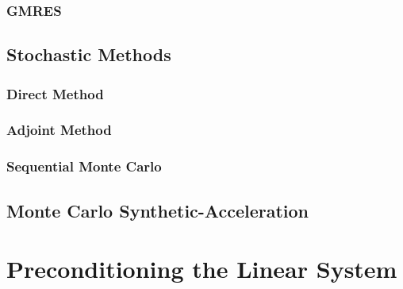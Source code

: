 \subsubsection{GMRES}
\label{subsubsec:gmres}

\subsection{Stochastic Methods}
\label{subsec:stochastic_methods}

\subsubsection{Direct Method}
\label{subsubsec:direct_mc}

\subsubsection{Adjoint Method}
\label{subsubsec:adjoint_mc}

\subsubsection{Sequential Monte Carlo}
\label{subsusbsec:sequential_mc}

\subsection{Monte Carlo Synthetic-Acceleration}
\label{subsec:mcsa}

\section{Preconditioning the Linear System}
\label{sec:linear_preconditioning}


